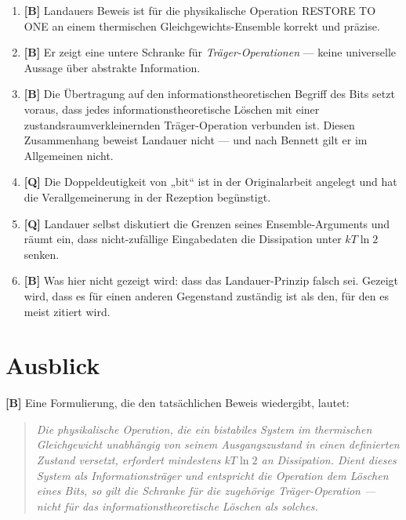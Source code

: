 \begin{enumerate}[leftmargin=1.6em,itemsep=0.35em]
  \item \textbf{[B]} Landauers Beweis ist für die physikalische Operation
        \textup{RESTORE TO ONE} an einem thermischen Gleichgewichts-Ensemble
        korrekt und präzise.
  \item \textbf{[B]} Er zeigt eine untere Schranke für \emph{Träger-Operationen} --- keine
        universelle Aussage über abstrakte Information.
  \item \textbf{[B]} Die Übertragung auf den informationstheoretischen Begriff des Bits
        setzt voraus, dass jedes informationstheoretische Löschen mit einer
        zustandsraumverkleinernden Träger-Operation verbunden ist. Diesen
        Zusammenhang beweist Landauer nicht --- und nach Bennett gilt er im
        Allgemeinen nicht.
  \item \textbf{[Q]} Die Doppeldeutigkeit von „bit“ ist in der Originalarbeit angelegt und
        hat die Verallgemeinerung in der Rezeption begünstigt.
  \item \textbf{[Q]} Landauer selbst diskutiert die Grenzen seines Ensemble-Arguments und
        räumt ein, dass nicht-zufällige Eingabedaten die Dissipation unter
        $kT\ln 2$ senken.
  \item \textbf{[B]} Was hier nicht gezeigt wird: dass das Landauer-Prinzip falsch sei.
        Gezeigt wird, dass es für einen anderen Gegenstand zuständig ist als den,
        für den es meist zitiert wird.
\end{enumerate}

\section{Ausblick}

\textbf{[B]} Eine Formulierung, die den tatsächlichen Beweis wiedergibt, lautet:

\begin{quote}
\emph{Die physikalische Operation, die ein bistabiles System im thermischen
Gleichgewicht unabhängig von seinem Ausgangszustand in einen definierten Zustand
versetzt, erfordert mindestens $kT\ln 2$ an Dissipation. Dient dieses System als
Informationsträger und entspricht die Operation dem Löschen eines Bits, so gilt
die Schranke für die zugehörige Träger-Operation --- nicht für das
informationstheoretische Löschen als solches.}
\end{quote}

